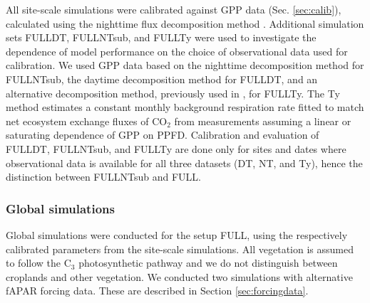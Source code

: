 \documentclass[gmd, manuscript]{copernicus}
\begin{document}
All site-scale simulations were calibrated against GPP data (Sec. \ref{sec:calib}), calculated using the nighttime flux decomposition method \citep{Reichstein2005-mp}. Additional simulation sets FULL\textunderscore DT, FULL\textunderscore NTsub, and FULL\textunderscore Ty were used to investigate the dependence of model performance on the choice of observational data used for calibration. We used GPP data based on the nighttime decomposition method \citep{Reichstein2005-mp} for FULL\textunderscore NTsub, the daytime decomposition method \citep{lasslop10} for FULL\textunderscore DT, and an alternative decomposition method, previously used in \citet{wang17natpl}, for FULL\textunderscore Ty. The Ty method estimates a constant monthly background respiration rate fitted to match net ecosystem exchange fluxes of CO$_2$ from measurements assuming a linear or saturating dependence of GPP on PPFD. Calibration and evaluation of FULL\textunderscore DT, FULL\textunderscore NTsub, and FULL\textunderscore Ty are done only for sites and dates where observational data is available for all three datasets (DT, NT, and Ty), hence the distinction between FULL\textunderscore NTsub and FULL. 

\subsubsection{Global simulations}

Global simulations were conducted for the setup FULL, using the respectively calibrated parameters from the site-scale simulations. All vegetation is assumed to follow the C$_3$ photosynthetic pathway and we do not distinguish between croplands and other vegetation. We conducted two simulations with alternative fAPAR forcing data. These are described in Section \ref{sec:forcingdata}.
\end{document}
